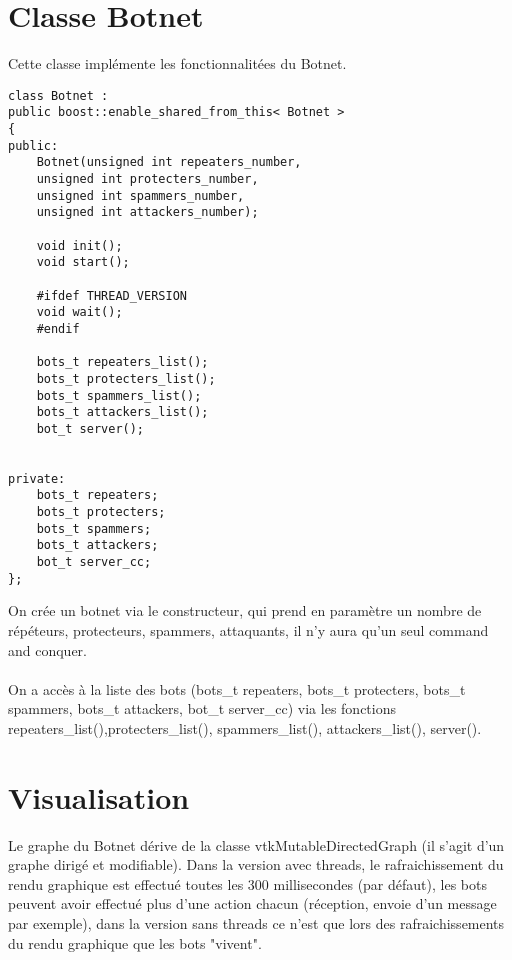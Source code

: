 \documentclass[11pt]{article}
\begin{document}
\section{Classe Botnet}
Cette classe implémente les fonctionnalitées du Botnet.\\

\begin{minipage}[c]{.46\linewidth}
\begin{verbatim} 
class Botnet : 
public boost::enable_shared_from_this< Botnet >
{
public:
	Botnet(unsigned int repeaters_number, 
	unsigned int protecters_number, 
	unsigned int spammers_number, 
	unsigned int attackers_number);
		   
	void init();
	void start();
	
	#ifdef THREAD_VERSION
	void wait();
	#endif
	
	bots_t repeaters_list();
	bots_t protecters_list();
	bots_t spammers_list();
	bots_t attackers_list();
	bot_t server();
	
	
private:	
	bots_t repeaters;
	bots_t protecters;
	bots_t spammers;
	bots_t attackers;
	bot_t server_cc;
};
\end{verbatim}	
\end{minipage} \hfill
\begin{minipage}[c]{.46\linewidth}
On crée un botnet via le constructeur, qui prend en paramètre un nombre de répéteurs, protecteurs, spammers, attaquants, il n'y aura qu'un seul command and conquer.\\\\On a accès à la liste des bots (bots\_t repeaters, bots\_t protecters, bots\_t spammers, bots\_t attackers, bot\_t server\_cc) via les fonctions repeaters\_list(),protecters\_list(), spammers\_list(), attackers\_list(), server().
\end{minipage}
\newpage


\section{Visualisation}
Le graphe du Botnet dérive de la classe vtkMutableDirectedGraph (il s'agit d'un graphe dirigé et modifiable). Dans la version avec threads, le rafraichissement du rendu graphique est effectué toutes les 300 millisecondes (par défaut), les bots peuvent avoir effectué plus d'une action chacun (réception, envoie d'un message par exemple), dans la version sans threads ce n'est que lors des rafraichissements du rendu graphique que les bots "vivent".
\end{document}
